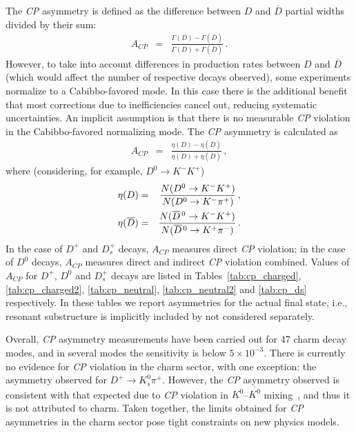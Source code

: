\vspace{0.8cm}
The \emph{CP} asymmetry is defined as the difference between 
$D$ and $\overline{D}$ partial widths divided by their sum:
\begin{eqnarray}  
A_{CP} & = & \frac{\Gamma(D)-\Gamma(\overline{D})}
{\Gamma(D)+\Gamma(\overline{D})}\,.
\end{eqnarray}
However, to take into account differences in production rates between 
$D$ and $\overline{D}$ (which would affect the number of respective 
decays observed), some experiments normalize to a Cabibbo-favored 
mode. In this case there is the additional benefit that most corrections 
due to inefficiencies cancel out, reducing systematic uncertainties. An 
implicit assumption is that there is no measurable \emph{CP} 
violation in the Cabibbo-favored normalizing mode. 
The \emph{CP} asymmetry is calculated as
\begin{eqnarray}
A_{CP} & = & \frac{\eta(D)-\eta(\overline{D})}{\eta(D)+\eta(\overline{D})}\,,
\end{eqnarray}
where (considering, for example, $D^0 \to K^-K^+$)
\begin{eqnarray}
 \eta(D) & = & \frac{N(D^0 \rightarrow K^-K^+)}{N(D^0 \rightarrow K^-\pi^+)}\,, \\
 \eta(\overline{D}) & = & \frac{N(\overline{D}{}^{\,0}\rightarrow K^-K^+)}
{N(\overline{D}{}^{\,0}\rightarrow K^+\pi^-)}\,.
\end{eqnarray}
In the case of $D^+$ and $D^+_s$ decays, $A^{}_{CP}$ measures 
direct \emph{CP} violation; in the case of $D^0$ decays, $A^{}_{CP}$ 
measures direct and indirect \emph{CP} violation combined.
Values of $A^{}_{CP}$ for $D^+$, $D^0$ and $D_s^+$ decays are listed in
Tables~\ref{tab:cp_charged}, \ref{tab:cp_charged2}, \ref{tab:cp_neutral}, \ref{tab:cp_neutral2} and \ref{tab:cp_ds} respectively.
In these tables we report asymmetries for the actual
final state, i.e., resonant substructure is implicitly 
included by not considered separately.

Overall, \emph{CP} asymmetry measurements have been
carried out for 47 charm decay modes, and in
several modes the sensitivity is below $5 \times 10^{-3}$. 
There is currently no evidence for \emph{CP} violation in
the charm sector, with one exception: the asymmetry
observed for $D^+ \to K^0_s\pi^+$. 
However, the \emph{CP} asymmetry observed is consistent
with that expected due to \emph{CP} violation in
$K^0$--$\overline{K^0}$ mixing~\cite{Grossman:2012aa},
and thus it is not attributed to charm.
%
Taken together, the limits obtained for \emph{CP} asymmetries 
in the charm sector pose tight constraints on new physics models.

